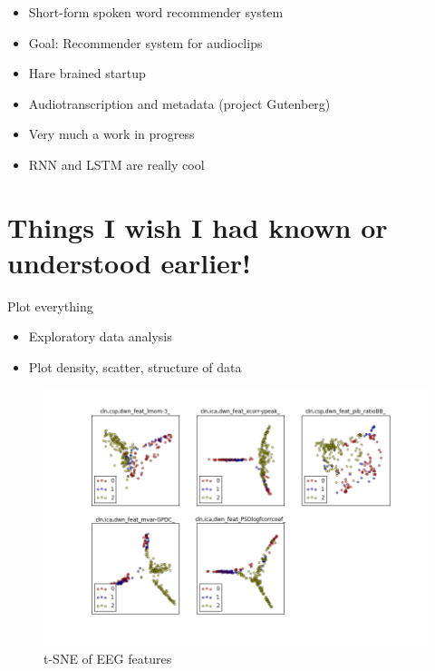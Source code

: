 \documentclass[ignorenonframetext,]{beamer}
\begin{document}
\begin{frame}

\begin{itemize}
\itemsep1pt\parskip0pt
\item
  Short-form spoken word recommender system
\item
  Goal: Recommender system for audioclips
\item
  Hare brained startup
\item
  Audiotranscription and metadata (project Gutenberg)
\item
  Very much a work in progress
\item
  RNN and LSTM are really cool
\end{itemize}

\end{frame}

\section{Things I wish I had known or understood
earlier!}\label{things-i-wish-i-had-known-or-understood-earlier}

\begin{frame}{Plot everything}

\begin{itemize}
\itemsep1pt\parskip0pt
\item
  Exploratory data analysis
\item
  Plot density, scatter, structure of data
\end{itemize}

\end{frame}

\begin{frame}

\begin{figure}[htbp]
\centering
\includegraphics{assets/presentation/GIML/tsne_class.png}
\caption{t-SNE of EEG features}
\end{figure}

\end{frame}
\end{document}
